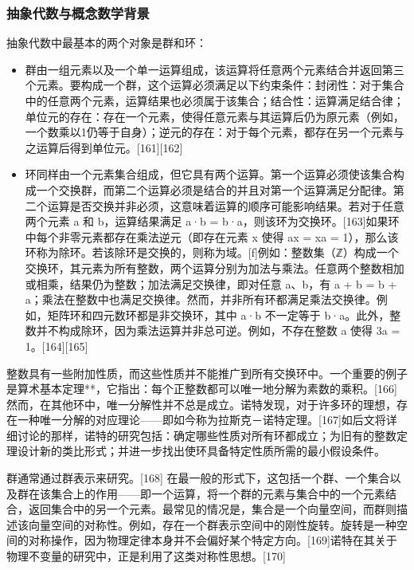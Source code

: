 \subsubsection{抽象代数与概念数学背景}
抽象代数中最基本的两个对象是群和环：
\begin{itemize}
\item 群由一组元素以及一个单一运算组成，该运算将任意两个元素结合并返回第三个元素。要构成一个群，这个运算必须满足以下约束条件：封闭性：对于集合中的任意两个元素，运算结果也必须属于该集合；结合性：运算满足结合律；单位元的存在：存在一个元素，使得任意元素与其运算后仍为原元素（例如，一个数乘以1仍等于自身）；逆元的存在：对于每个元素，都存在另一个元素与之运算后得到单位元。[161][162]
\item 环同样由一个元素集合组成，但它具有两个运算。第一个运算必须使该集合构成一个交换群，而第二个运算必须是结合的并且对第一个运算满足分配律。第二个运算是否交换并非必须，这意味着运算的顺序可能影响结果。若对于任意两个元素 a 和 b，运算结果满足 a·b = b·a，则该环为交换环。[163]如果环中每个非零元素都存在乘法逆元（即存在元素 x 使得 ax = xa = 1），那么该环称为除环。若该除环是交换的，则称为域。[f]例如：整数集（ℤ）构成一个交换环，其元素为所有整数，两个运算分别为加法与乘法。任意两个整数相加或相乘，结果仍为整数；加法满足交换律，即对任意 a、b，有 a + b = b + a；乘法在整数中也满足交换律。然而，并非所有环都满足乘法交换律。例如，矩阵环和四元数环都是非交换环，其中 a·b 不一定等于 b·a。此外，整数并不构成除环，因为乘法运算并非总可逆。例如，不存在整数 a 使得 3a = 1。[164][165]
\end{itemize}
整数具有一些附加性质，而这些性质并不能推广到所有交换环中。一个重要的例子是算术基本定理**，它指出：每个正整数都可以唯一地分解为素数的乘积。[166] 然而，在其他环中，唯一分解性并不总是成立。诺特发现，对于许多环的理想，存在一种唯一分解的对应理论——即如今称为拉斯克－诺特定理。[167]如后文将详细讨论的那样，诺特的研究包括：确定哪些性质对所有环都成立；为旧有的整数定理设计新的类比形式；并进一步找出使环具备特定性质所需的最小假设条件。

群通常通过群表示来研究。[168] 在最一般的形式下，这包括一个群、一个集合以及群在该集合上的作用——即一个运算，将一个群的元素与集合中的一个元素结合，返回集合中的另一个元素。最常见的情况是，集合是一个向量空间，而群则描述该向量空间的对称性。例如，存在一个群表示空间中的刚性旋转。旋转是一种空间的对称操作，因为物理定律本身并不会偏好某个特定方向。[169]诺特在其关于物理不变量的研究中，正是利用了这类对称性思想。[170]

